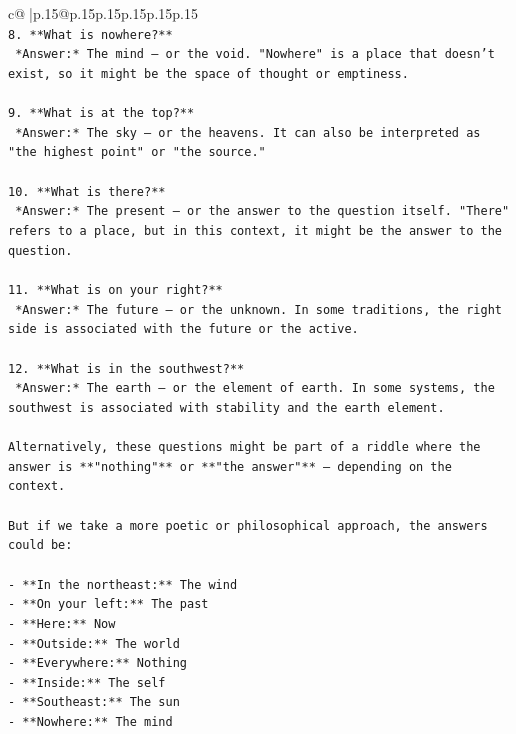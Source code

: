 \documentclass{article}
\begin{document}
{\begin{supertabular}{c@{$\;$}|p{.15\linewidth}@{}p{.15\linewidth}p{.15\linewidth}p{.15\linewidth}p{.15\linewidth}p{.15\linewidth}}
{{{\\ 
\texttt{8. **What is nowhere?**  } \\
\texttt{   *Answer:* The mind — or the void. "Nowhere" is a place that doesn't exist, so it might be the space of thought or emptiness.} \\
\\ 
\texttt{9. **What is at the top?**  } \\
\texttt{   *Answer:* The sky — or the heavens. It can also be interpreted as "the highest point" or "the source."} \\
\\ 
\texttt{10. **What is there?**  } \\
\texttt{   *Answer:* The present — or the answer to the question itself. "There" refers to a place, but in this context, it might be the answer to the question.} \\
\\ 
\texttt{11. **What is on your right?**  } \\
\texttt{   *Answer:* The future — or the unknown. In some traditions, the right side is associated with the future or the active.} \\
\\ 
\texttt{12. **What is in the southwest?**  } \\
\texttt{   *Answer:* The earth — or the element of earth. In some systems, the southwest is associated with stability and the earth element.} \\
\\ 
\texttt{Alternatively, these questions might be part of a riddle where the answer is **"nothing"** or **"the answer"** — depending on the context.} \\
\\ 
\texttt{But if we take a more poetic or philosophical approach, the answers could be:} \\
\\ 
\texttt{{-} **In the northeast:** The wind  } \\
\texttt{{-} **On your left:** The past  } \\
\texttt{{-} **Here:** Now  } \\
\texttt{{-} **Outside:** The world  } \\
\texttt{{-} **Everywhere:** Nothing  } \\
\texttt{{-} **Inside:** The self  } \\
\texttt{{-} **Southeast:** The sun  } \\
\texttt{{-} **Nowhere:** The mind  } \\
}}}
\end{supertabular}}
\end{document}
